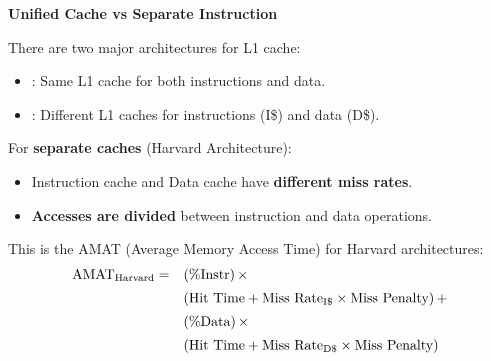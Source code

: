 \highspace
\begin{flushleft}
    \textcolor{Green3}{ \textbf{Unified Cache vs Separate Instruction}}
\end{flushleft}
There are two major architectures for L1 cache:
\begin{itemize}
    \item {}: Same L1 cache for both instructions and data.
    \item {}: Different L1 caches for instructions (I\$) and data (D\$).
\end{itemize}
For \textbf{separate caches} (Harvard Architecture):
\begin{itemize}
    \item Instruction cache and Data cache have \textbf{different miss rates}.
    \item \textbf{Accesses are divided} between instruction and data operations.
\end{itemize}
This is the AMAT (Average Memory Access Time) for Harvard architectures:
\begin{equation}\index{Formula Memory Hierarchy: AMAT Harvard}\label{eq: AMAT Harvard}
    \begin{array}{rl}
        \text{AMAT}_{\text{Harvard}} =& (\%\text{Instr})\, \times \\ [.5em]
        & (\text{Hit Time} + \text{Miss Rate}_{\text{I}\$} \times \text{Miss Penalty})\, + \\ [.5em]
        & (\%\text{Data})\, \times \\ [.5em]
        & (\text{Hit Time} + \text{Miss Rate}_{\text{D}\$} \times \text{Miss Penalty})
    \end{array}
\end{equation}

